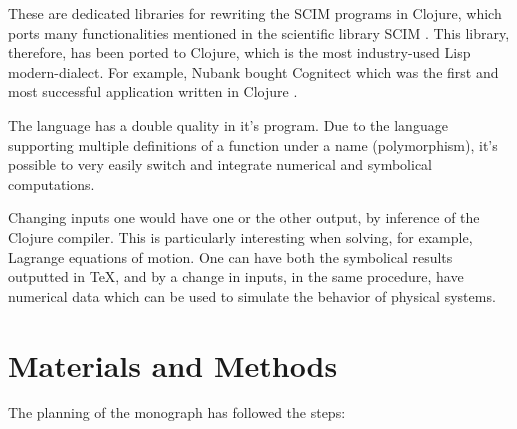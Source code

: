 \documentclass[
12pt,				%
openright,			%
oneside,			%
a4paper,			%
brazil,				%
english,			%
]{abntex2}
\begin{document}
These are dedicated libraries for rewriting the SCIM programs in
Clojure, which ports many functionalities mentioned in the scientific
library SCIM \cite{sicmutils2016github}. This library, therefore, has
been ported to Clojure, which is the most industry-used Lisp
modern-dialect. For example, Nubank bought Cognitect which was the
first and most successful application written in Clojure \cite{clojure2020}. 

The language has a double quality in it's program. Due to the language
supporting multiple definitions of a function under a name
(polymorphism), it's possible to very easily switch and integrate
numerical and symbolical computations.

Changing inputs one would have one or the other output, by inference
of the Clojure compiler. This is particularly interesting when
solving, for example, Lagrange equations of motion. One can have both
the symbolical results outputted in \TeX{}, and by a change in inputs,
in the same procedure, have numerical data which can be used to
simulate the behavior of physical systems. 


\chapter{Materials and Methods}
The planning of the monograph has followed the steps:
\end{document}
